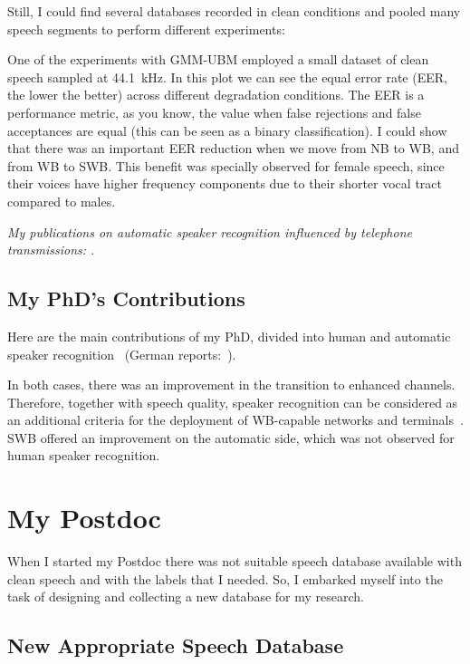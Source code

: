 \documentclass[a4paper]{article}
\begin{document}
Still, I could find several databases recorded in clean conditions and pooled many speech segments to perform different experiments:

One of the experiments with GMM-UBM employed a small dataset of clean speech sampled at 44.1~kHz. In this plot we can see the equal error rate (EER, the lower the better) across different degradation conditions. The EER is a performance metric, as you know, the value when false rejections and false acceptances are equal (this can be seen as a binary classification). I could show that there was an important EER reduction when we move from NB to WB, and from WB to SWB. This benefit was specially observed for female speech, since their voices have higher frequency components due to their shorter vocal tract compared to males.

\textit{My publications on automatic speaker recognition influenced by telephone transmissions: \cite{my2, my6, my7, my8, my9}}.

\subsection{My PhD's Contributions}

Here are the main contributions of my PhD, divided into human and automatic speaker recognition~\cite{myBook} (German reports:~\cite{my13, my20}). 

In both cases, there was an improvement in the transition to enhanced channels. Therefore, together with speech quality, speaker recognition can be considered as an additional criteria for the deployment of WB-capable networks and terminals~\cite{my10, my14, my15}. SWB offered an improvement on the automatic side, which was not observed for human speaker recognition.



\section{My Postdoc}

When I started my Postdoc there was not suitable speech database available with clean speech and with the labels that I needed. So, I embarked myself into the task of designing and collecting a new database for my research.

\subsection{New Appropriate Speech Database}
\end{document}
